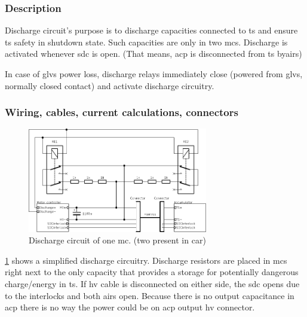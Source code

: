 \subsubsection{Description}

Discharge circuit's purpose is to discharge capacities connected to \gls{ts} and ensure \gls{ts} safety in shutdown state. Such capacities are only in two \glspl{mc}.
Discharge is activated whenever \gls{sdc} is open. (That means, \gls{acp} is disconnected from \gls{ts} by\glspl{air})

In case of \gls{glvs} power loss, discharge relays immediately close (powered from \gls{glvs}, normally closed contact) and activate discharge circuitry.

\subsubsection{Wiring, cables, current calculations, connectors}

\begin{figure}[H]
	\centering
	\includegraphics[width=0.7\textwidth]{./img/MC_discharge.pdf}
	\caption{Discharge circuit of one \gls{mc}. (two present in car)}
	\label{fig:discharge-circuit}
\end{figure}

\ref{fig:discharge-circuit} shows a simplified discharge circuitry. Discharge resistors are placed in \glspl{mc} right next to the only capacity that provides a storage for potentially dangerous charge/energy in \gls{ts}. If \gls{hv} cable is disconnected on either side, the \gls{sdc} opens due to the interlocks and both \glspl{air} open. Because there is no output capacitance in \gls{acp} there is no way the power could be on \gls{acp} output \gls{hv} connector.

